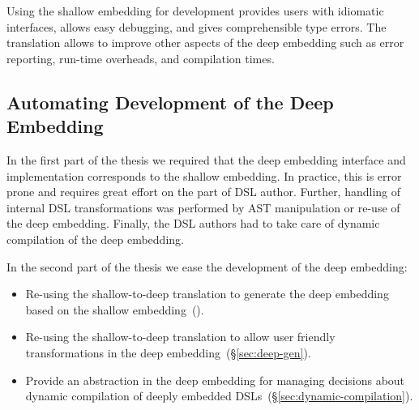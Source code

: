 Using the shallow embedding for development provides users with idiomatic interfaces,
 allows easy debugging, and gives comprehensible type errors. The translation allows to improve other aspects of
 the deep embedding such as error reporting, run-time overheads, and compilation times.




\subsection{Automating Development of the Deep Embedding}

 In the first part of the thesis we required that the deep embedding interface
 and implementation corresponds to the shallow embedding. In practice,
 this is error prone and requires great effort on the part of DSL author. Further,
 handling of internal DSL transformations was performed by AST manipulation or
 re-use of the deep embedding. Finally, the DSL authors had to take care of dynamic
 compilation of the deep embedding.

 In the second part of the thesis we ease the development of the deep embedding: \begin{itemize}

   \item Re-using the shallow-to-deep translation to generate the deep embedding based on the
    shallow embedding~().

   \item Re-using the shallow-to-deep translation to allow user friendly
    transformations in the deep embedding~(\S \ref{sec:deep-gen}).

    \item Provide an abstraction in the deep embedding for managing decisions about
     dynamic compilation of deeply embedded DSLs~(\S \ref{sec:dynamic-compilation}).

 \end{itemize}




